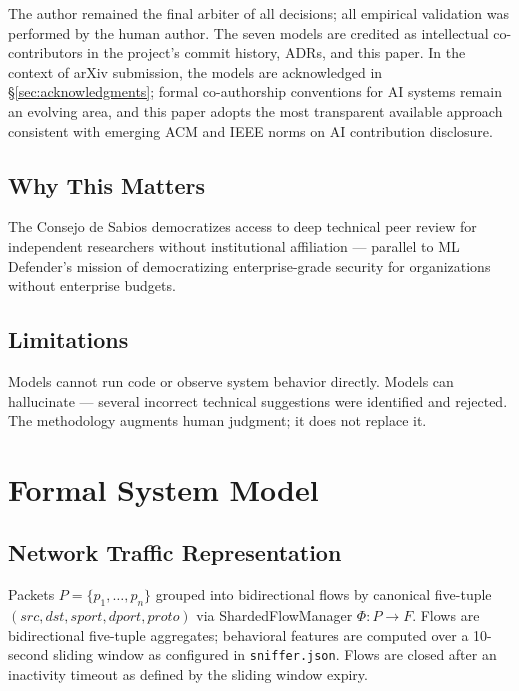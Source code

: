 \documentclass[11pt,a4paper]{article}
\begin{document}
    The author remained the final arbiter of all decisions; all empirical validation was
    performed by the human author. The seven models are credited as intellectual co-contributors
    in the project's commit history, ADRs, and this paper. In the context of arXiv submission,
    the models are acknowledged in \S\ref{sec:acknowledgments}; formal co-authorship conventions
    for AI systems remain an evolving area, and this paper adopts the most transparent available
    approach consistent with emerging ACM and IEEE norms on AI contribution disclosure.

    \subsection{Why This Matters}

    The Consejo de Sabios democratizes access to deep technical peer review for independent
    researchers without institutional affiliation --- parallel to ML Defender's mission of
    democratizing enterprise-grade security for organizations without enterprise budgets.

    \subsection{Limitations}

    Models cannot run code or observe system behavior directly. Models can hallucinate --- several
    incorrect technical suggestions were identified and rejected. The methodology augments human
    judgment; it does not replace it.

    \section{Formal System Model}

    \subsection{Network Traffic Representation}

    Packets $P = \{p_1, \dots, p_n\}$ grouped into bidirectional flows by canonical five-tuple
    $(src, dst, sport, dport, proto)$ via ShardedFlowManager $\Phi : P \rightarrow F$. Flows
    are bidirectional five-tuple aggregates; behavioral features are computed over a 10-second
    sliding window as configured in \texttt{sniffer.json}. Flows are closed after an inactivity
    timeout as defined by the sliding window expiry.
\end{document}
